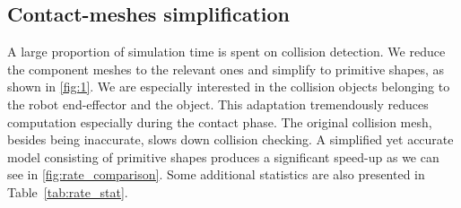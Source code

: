 \subsection{Contact-meshes simplification}
A large proportion of simulation time is spent on collision detection. We reduce the component meshes to the relevant ones and simplify to primitive shapes, as shown in \fig\ref{fig:1}. We are especially interested in the collision objects belonging to the robot end-effector and the object. This adaptation tremendously reduces computation especially during the contact phase. The original collision mesh, besides being inaccurate, slows down collision checking. A simplified yet accurate model consisting of primitive shapes produces a significant speed-up as we can see in \fig\ref{fig:rate_comparison}. Some additional statistics are also presented in Table~\ref{tab:rate_stat}.

